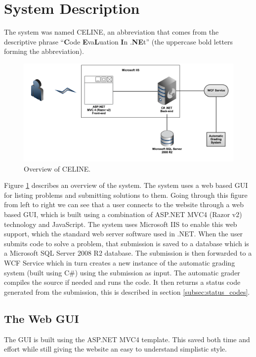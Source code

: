 \section{System Description}
The system was named CELINE, an abbreviation that comes from the descriptive phrase ``\textbf{C}ode \textbf{E}va\textbf{L}uation \textbf{I}n .\textbf{NE}t'' (the uppercase bold letters forming the abbreviation). 

\begin{figure}[h]
	\centering
	\includegraphics[width=0.9\linewidth]{chapters/media/overview.png}
	\caption{Overview of CELINE.}
	\label{fig:SystemOverview}
\end{figure}

Figure \ref{fig:SystemOverview} describes an overview of the system. The system uses a web based GUI for listing problems and submitting solutions to them. Going through this figure from left to right we can see that a user connects to the website through a web based GUI, which is built using a combination of ASP.NET MVC4 (Razor v2) technology and JavaScript. The system uses Microsoft IIS to enable this web support, which the standard web server software used in .NET. When the user submits code to solve a problem, that submission is saved to a database which is a Microsoft SQL Server 2008 R2 database. The submission is then forwarded to a WCF Service which in turn creates a new instance of the automatic grading system (built using C\#) using the submission as input. The automatic grader compiles the source if needed and runs the code. It then returns a status code generated from the submission, this is described in section \ref{subsec:status_codes}.


\subsection{The Web GUI}
The GUI is built using the ASP.NET MVC4 template. This saved both time and effort while still giving the website an easy to understand simplistic style. 

